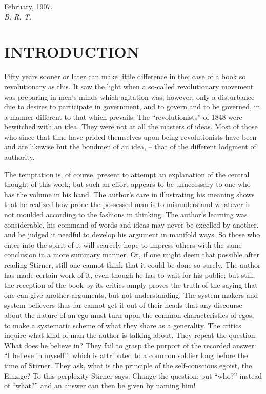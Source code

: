 \documentclass[12pt,a4paper]{book}
\begin{document}
\begin{flushright}
February, 1907.\\
 \textit{B. R. T.}\end{flushright}

\chapter[Introduction]{\centering INTRODUCTION}

Fifty years sooner or later can make little difference in the; case of a book 
so revolutionary as this. It saw the light when a so-called revolutionary 
movement was preparing in men's minds which agitation was, however, only a 
disturbance due to desires to participate in government, and to govern and to 
be governed, in a manner different to that which prevails. The 
``revolutionists'' of 1848 were bewitched with an idea. They were not at all 
the masters of ideas. Most of those who since that time have prided themselves 
upon being revolutionists have been and are likewise but the bondmen of an 
idea, -- that of the different lodgment of authority.

The temptation is, of course, present to attempt an explanation of the central 
thought of this work; but such an effort appears to be unnecessary to one who 
has the volume in his hand. The author's care in illustrating his meaning 
shows that he realized how prone the possessed man is to misunderstand 
whatever is not moulded according to the fashions in thinking. The author's 
learning was considerable, his command of words and ideas may never be 
excelled by another, and he judged it needful to develop his argument in 
manifold ways. So those who enter into the spirit of it will scarcely hope to 
impress others with the same conclusion in a more summary manner. Or, if one 
might deem that possible after reading Stirner, still one cannot think that it 
could be done so surely. The author has made certain work of it, even though 
he has to wait for his public; but still, the reception of the book by its 
critics amply proves the truth of the saying that one can give another 
arguments, but not understanding. The system-makers and system-believers thus 
far cannot get it out of their heads that any discourse about the nature of an 
ego must turn upon the common characteristics of egos, to make a systematic 
scheme of what they share as a generality. The critics inquire what kind of 
man the author is talking about. They repeat the question: What does he 
believe in? They fail to grasp the purport of the recorded answer: ``I 
believe in myself''; which is attributed to a common soldier long before the 
time of Stirner. They ask, what is the principle of the self-conscious egoist, 
the Einzige? To this perplexity Stirner says: Change the question; put 
``who?'' instead of ``what?'' and an answer can then be given by naming 
him!
\end{document}
